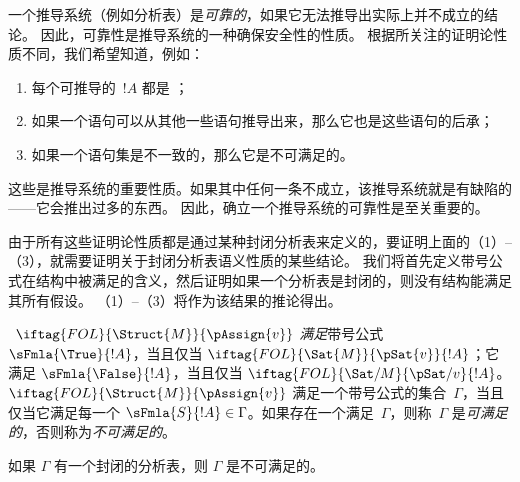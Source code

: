 \documentclass[../../../include/open-logic-section]{subfiles}
\begin{document}
      {}
      {}


\begin{explain}
一个推导系统（例如分析表）是\emph{可靠的}，如果它无法推导出实际上并不成立的结论。
因此，可靠性是推导系统的一种确保安全性的性质。
根据所关注的证明论性质不同，我们希望知道，例如：
\begin{enumerate}
\item 每个可推导的~$!A$ 都是 ；
\item 如果一个语句可以从其他一些语句推导出来，那么它也是这些语句的后承；
\item 如果一个语句集是不一致的，那么它是不可满足的。
\end{enumerate}
这些是推导系统的重要性质。如果其中任何一条不成立，该推导系统就是有缺陷的——它会推出过多的东西。
因此，确立一个推导系统的可靠性是至关重要的。

由于所有这些证明论性质都是通过某种封闭分析表来定义的，要证明上面的（1）–（3），就需要证明关于封闭分析表语义性质的某些结论。
我们将首先定义带号公式在结构中被满足的含义，然后证明如果一个分析表是封闭的，则没有结构能满足其所有假设。
（1）–（3）将作为该结果的推论得出。
\end{explain}

\begin{defn}
~$\iftag{FOL}{\Struct{M}}{\pAssign{v}}$
\emph{满足}带号公式 $\sFmla{\True}{!A}$，当且仅当
$\iftag{FOL}{\Sat{M}}{\pSat{v}}{!A}$；它满足
$\sFmla{\False}{!A}$，当且仅当
$\iftag{FOL}{\Sat/{M}}{\pSat/{v}}{!A}$。$\iftag{FOL}{\Struct{M}}{\pAssign{v}}$
满足一个带号公式的集合~$\Gamma$，当且仅当它满足每一个
$\sFmla{S}{!A} \in \Gamma$。如果存在一个满足~$\Gamma$，则称~$\Gamma$ 是\emph{可满足的}，否则称为\emph{不可满足的}。
\end{defn}

\begin{thm}[可靠性]
  如果 $\Gamma$ 有一个封闭的分析表，则 $\Gamma$ 是不可满足的。
\end{thm}
\end{document}
